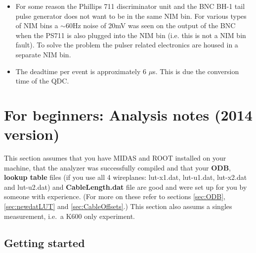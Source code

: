 \documentclass[11pt]{report}
\begin{document}
\begin{itemize}

\item For some reason the Phillips 711 discriminator unit and the BNC BH-1 tail pulse generator does
not want to be in the same NIM bin. %
%
%
For various types of NIM bins a $\sim$60Hz noise of 20mV was seen on the output of the BNC when the PS711 is also 
plugged into the NIM bin (i.e. this is not a NIM bin fault).  
To solve the problem the pulser related electronics are housed in a separate NIM bin.

\item The deadtime per event is  approximately 6 $\mu$s. This is due the conversion time of the QDC.

\end{itemize}





\section{For beginners: Analysis notes (2014 version)}\label{sec:analysisforbeginners}

This section assumes that you have MIDAS and ROOT installed on your machine, that the analyzer was 
successfully compiled and that your {\bf ODB}, {\bf lookup table} files 
(if you use all 4 wireplanes: lut-x1.dat, lut-u1.dat, lut-x2.dat and lut-u2.dat) and 
{\bf CableLength.dat} file are good and were set up for you by someone with experience.  
(For more on these refer to sections \ref{sec:ODB}, \ref{sec:newdatLUT} and \ref{sec:CableOffsets}.)
This section also assums a singles measurement, i.e.~a K600 only experiment.

\subsection{Getting started}
\end{document}
